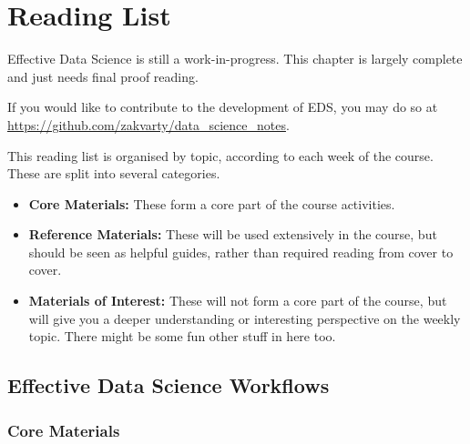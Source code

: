 \documentclass[
  letterpaper,
  DIV=11,
  numbers=noendperiod]{scrreprt}
\begin{document}
\cleardoublepage
{}
{}
\appendix

\chapter{Reading List}\label{reading-list}

\begin{tcolorbox}[enhanced jigsaw, leftrule=.75mm, bottomtitle=1mm, toprule=.15mm, colbacktitle=quarto-callout-note-color!10!white, breakable, colback=white, bottomrule=.15mm, opacityback=0, colframe=quarto-callout-note-color-frame, title=\textcolor{quarto-callout-note-color}{\faInfo}\hspace{0.5em}{Note}, titlerule=0mm, toptitle=1mm, opacitybacktitle=0.6, arc=.35mm, rightrule=.15mm, coltitle=black, left=2mm]

Effective Data Science is still a work-in-progress. This chapter is
largely complete and just needs final proof reading.

If you would like to contribute to the development of EDS, you may do so
at \url{https://github.com/zakvarty/data_science_notes}.

\end{tcolorbox}

This reading list is organised by topic, according to each week of the
course. These are split into several categories.

\begin{itemize}
\item
  \textbf{Core Materials:} These form a core part of the course
  activities.
\item
  \textbf{Reference Materials:} These will be used extensively in the
  course, but should be seen as helpful guides, rather than required
  reading from cover to cover.
\item
  \textbf{Materials of Interest:} These will not form a core part of the
  course, but will give you a deeper understanding or interesting
  perspective on the weekly topic. There might be some fun other stuff
  in here too.
\end{itemize}

\section{Effective Data Science Workflows}\label{workflows-reading}

\subsection*{Core Materials}\label{core-materials}
\end{document}
